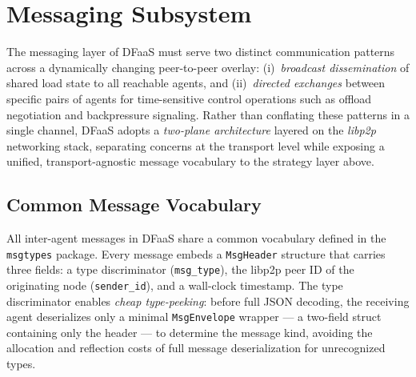 
\section{Messaging Subsystem}
\label{sec:messaging}

The messaging layer of \ac{DFaaS} must serve two distinct communication
patterns across a dynamically changing peer-to-peer overlay: (i)~\emph{broadcast
dissemination} of shared load state to all reachable agents, and
(ii)~\emph{directed exchanges} between specific pairs of agents for
time-sensitive control operations such as offload negotiation and backpressure
signaling.
Rather than conflating these patterns in a single channel, \ac{DFaaS} adopts a
\emph{two-plane architecture} layered on the \emph{libp2p} networking stack,
separating concerns at the transport level while exposing a unified,
transport-agnostic message vocabulary to the strategy layer above.

\subsection{Common Message Vocabulary}
\label{subsec:msg-vocabulary}

All inter-agent messages in \ac{DFaaS} share a common vocabulary defined in the
\texttt{msgtypes} package.
Every message embeds a \texttt{MsgHeader} structure that carries three fields:
a type discriminator (\texttt{msg\_type}), the libp2p peer ID of the
originating node (\texttt{sender\_id}), and a wall-clock timestamp.
The type discriminator enables \emph{cheap type-peeking}: before full \ac{JSON}
decoding, the receiving agent deserializes only a minimal
\texttt{MsgEnvelope} wrapper — a two-field struct containing only the header
— to determine the message kind, avoiding the allocation and reflection costs of
full message deserialization for unrecognized types.

